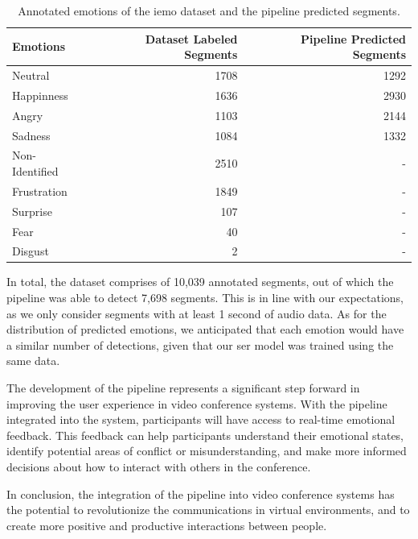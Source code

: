 \begin{table}[H]
	\centering
	\label{table:iemo_pipeline}
	\caption{Annotated emotions of the \ac{iemo} dataset and the pipeline predicted segments.}
	\begin{tabular}{lrr}
		\toprule
		Emotions & Dataset Labeled Segments & Pipeline Predicted Segments \\
		\midrule
		Neutral & 1708 & 1292 \\
		Happinness & 1636 & 2930 \\
		Angry & 1103 & 2144 \\
		Sadness & 1084 & 1332 \\
		Non-Identified & 2510 & - \\
		Frustration & 1849 & - \\
		Surprise	& 107 & - \\
		Fear & 40 & - \\
		Disgust & 2 & - \\
		\bottomrule
	\end{tabular}
\end{table}

In total, the dataset comprises of 10,039 annotated segments, out of which the pipeline was able to detect 7,698 segments. This is in line with our expectations, as we only consider segments with at least 1 second of audio data. As for the distribution of predicted emotions, we anticipated that each emotion would have a similar number of detections, given that our \ac{ser} model was trained using the same data.

The development of the pipeline represents a significant step forward in improving the user experience in video conference systems. With the pipeline integrated into the system, participants will have access to real-time emotional feedback. This feedback can help participants understand their emotional states, identify potential areas of conflict or misunderstanding, and make more informed decisions about how to interact with others in the conference. 

In conclusion, the integration of the pipeline into video conference systems has the potential to revolutionize the communications in virtual environments, and to create more positive and productive interactions between people.
